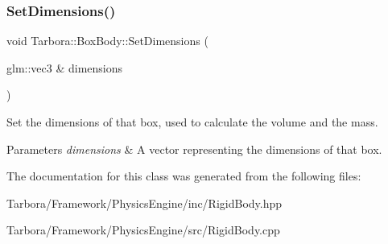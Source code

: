 \subsubsection{\texorpdfstring{Set\+Dimensions()}{SetDimensions()}}
{\footnotesize\ttfamily void Tarbora\+::\+Box\+Body\+::\+Set\+Dimensions (\begin{DoxyParamCaption}\item[{glm\+::vec3 \&}]{dimensions }\end{DoxyParamCaption})\hspace{0.3cm}{\ttfamily [inline]}}



Set the dimensions of that box, used to calculate the volume and the mass. 


\begin{DoxyParams}{Parameters}
{\em dimensions} & A vector representing the dimensions of that box. \\
\hline
\end{DoxyParams}


The documentation for this class was generated from the following files\+:\begin{DoxyCompactItemize}
\item 
Tarbora/\+Framework/\+Physics\+Engine/inc/Rigid\+Body.\+hpp\item 
Tarbora/\+Framework/\+Physics\+Engine/src/Rigid\+Body.\+cpp\end{DoxyCompactItemize}
